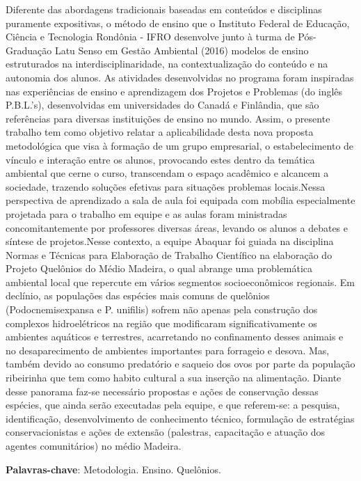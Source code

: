 \documentclass[article,12pt,onesidea,4paper,english,brazil]{abntex2}
\begin{document}
	\noindent Diferente das abordagens tradicionais baseadas em conteúdos e disciplinas puramente expositivas, o método de ensino que o Instituto Federal de Educação, Ciência e Tecnologia Rondônia - IFRO desenvolve junto à turma de Pós-Graduação Latu Senso em Gestão Ambiental (2016) modelos de ensino estruturados na interdisciplinaridade, na contextualização do conteúdo e na autonomia dos alunos. As atividades desenvolvidas no programa foram inspiradas nas experiências de ensino e aprendizagem dos Projetos e Problemas (do inglês P.B.L.’s), desenvolvidas em  universidades do Canadá e Finlândia, que são referências para diversas instituições de ensino no mundo. Assim, o presente trabalho tem como objetivo relatar a aplicabilidade desta nova proposta metodológica que visa à formação de um grupo empresarial, o estabelecimento de vínculo e interação entre os alunos, provocando estes dentro da temática ambiental que cerne o curso, transcendam o espaço acadêmico e alcancem a sociedade, trazendo soluções efetivas para situações problemas locais.Nessa perspectiva de aprendizado a sala de aula foi equipada com mobília especialmente projetada para o trabalho em equipe e as aulas foram ministradas concomitantemente por professores diversas áreas, levando os alunos a debates e síntese de projetos.Nesse contexto, a equipe Abaquar foi guiada na disciplina Normas e Técnicas para Elaboração de Trabalho Científico na elaboração do Projeto Quelônios do Médio Madeira, o qual abrange uma problemática ambiental local que repercute em vários segmentos socioeconômicos regionais. Em declínio, as populações das espécies mais comuns de quelônios (Podocnemisexpansa e P. unifilis) sofrem não apenas pela construção dos complexos hidroelétricos na região que modificaram significativamente os ambientes aquáticos e terrestres, acarretando no confinamento desses animais e no desaparecimento de ambientes importantes para forrageio e desova. Mas, também devido ao consumo predatório e saqueio dos ovos por parte da população ribeirinha que tem como habito cultural a sua inserção na alimentação. Diante desse panorama faz-se necessário propostas e ações de conservação dessas espécies, que ainda serão executadas pela equipe, e que referem-se: a pesquisa, identificação, desenvolvimento de conhecimento técnico, formulação de estratégias conservacionistas e ações de extensão (palestras, capacitação e atuação dos agentes comunitários) no médio Madeira.
	
	\vspace{\onelineskip}
	
	\noindent
	\textbf{Palavras-chave}: Metodologia. Ensino. Quelônios.
	
\end{document}
